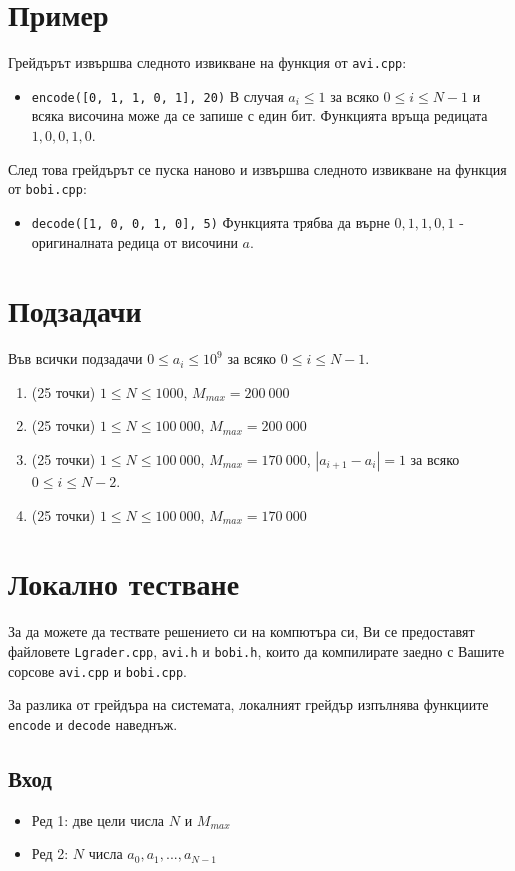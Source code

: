 \documentclass[a4paper,11pt]{article}
\newcommand{\code}[1]{\texttt{#1}}
\newcommand{\noskip}{\vspace{-\parskip}}
\begin{document}
\section*{Пример}
Грейдърът извършва следното извикване на функция от \code{avi.cpp}:
\noskip
\begin{itemize}
    \item \code{encode([0, 1, 1, 0, 1], 20)}
        В случая $a_i \leq 1$ за всяко $0 \leq i \leq N-1$ и всяка височина може
        да се запише с един бит.
        Функцията връща редицата $1, 0, 0, 1, 0$.
\end{itemize}
След това грейдърът се пуска наново и извършва следното извикване на функция от
\code{bobi.cpp}:
\noskip
\begin{itemize}
    \item \code{decode([1, 0, 0, 1, 0], 5)}
        Функцията трябва да върне $0, 1, 1, 0, 1$ - оригиналната редица от
        височини $a$.
\end{itemize}

\section*{Подзадачи}
Във всички подзадачи $0 \leq a_i \leq 10^9$ за всяко $0 \leq i \leq N - 1$.

\begin{enumerate}
    \item (25 точки) $1 \leq N \leq 1000$, $M_{max}=200\ 000$
    \item (25 точки) $1 \leq N \leq 100\ 000$, $M_{max}=200\ 000$
    \item (25 точки) $1 \leq N \leq 100\ 000$, $M_{max}=170\ 000$,
        $|a_{i + 1} - a_i| = 1$ за всяко $0 \leq i \leq N-2$.
    \item (25 точки) $1 \leq N \leq 100\ 000$, $M_{max}=170\ 000$
\end{enumerate}

\section*{Локално тестване}
За да можете да тествате решението си на компютъра си, Ви се предоставят
файловете \code{Lgrader.cpp}, \code{avi.h} и \code{bobi.h}, които да компилирате
заедно с Вашите сорсове \code{avi.cpp} и \code{bobi.cpp}. 

За разлика от грейдъра на системата, локалният грейдър изпълнява функциите 
\code{encode} и \code{decode} наведнъж.
\noskip
\subsection*{Вход}
\noskip
\begin{itemize}
    \item Ред 1: две цели числа $N$ и $M_{max}$
    \item Ред 2: $N$ числа $a_0, a_1, ..., a_{N-1}$
\end{itemize}
\noskip
\end{document}
